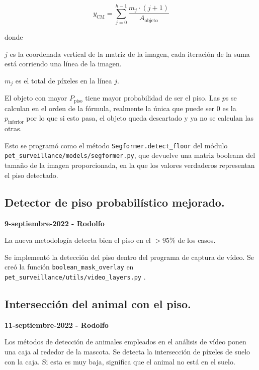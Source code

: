 \begin{equation}
    y_{\text{CM}} = \sum_{j=0}^{h-1}\frac{m_j \cdot (j+1)}{A_{\text{objeto}}}
\end{equation}

donde

$j$ es la coordenada vertical de la matriz de la imagen, cada iteración de la suma está corriendo una línea de la imagen.

$m_j$ es el total de píxeles en la línea $j$.


El objeto con mayor $P_{\text{piso}}$ tiene mayor probabilidad de ser el piso. Las $p$s se calculan en el orden de la fórmula, realmente la única que puede ser 0 es la $p_\text{{inferior}}$ por lo que si esto pasa, el objeto queda descartado y ya no se calculan las otras. 

Esto se programó como el método \texttt{Segformer.detect\_floor} del módulo \texttt{pet\_surveillance/models/segformer.py}, que devuelve una matriz booleana del tamaño de la imagen proporcionada, en la que los valores verdaderos representan el piso detectado.


\subsection*{Detector de piso probabilístico mejorado.}

\textbf{9-septiembre-2022 - Rodolfo}

La nueva metodología detecta bien el piso en el $>95\%$ de los casos. 

Se implementó la detección del piso dentro del programa de captura de vídeo. Se creó la función \texttt{boolean\_mask\_overlay} en \texttt{pet\_surveillance/utils/video\_layers.py} .

\subsection*{Intersección del animal con el piso.}
\textbf{11-septiembre-2022 - Rodolfo}

Los métodos de detección de animales empleados en el análisis de vídeo ponen una caja al rededor de la mascota. Se detecta la intersección de píxeles de suelo con la caja. Si esta es muy baja, significa que el animal no está en el suelo.



